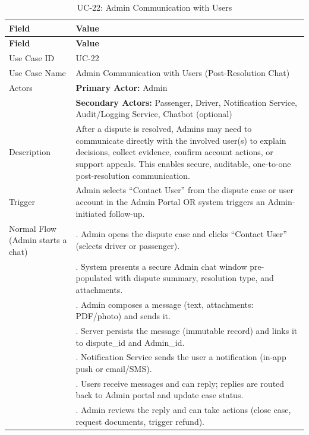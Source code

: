 \begin{longtable}{|>{\raggedright\arraybackslash}p{4cm}|>{\raggedright\arraybackslash}p{11cm}|}
\caption{UC-22: Admin Communication with Users}
\label{tab:uc-22} \\
\hline
\rowcolor{lightgray!30}
\textbf{Field} & \textbf{Value} \\
\hline
\endfirsthead
\hline
\rowcolor{lightgray!30}
\textbf{Field} & \textbf{Value} \\
\hline
\endhead
\hline
\endfoot
\hline
\endlastfoot
Use Case ID & UC-22 \\
\hline
Use Case Name & Admin Communication with Users (Post-Resolution Chat) \\
\hline
Actors & \textbf{Primary Actor:} Admin \\
& \textbf{Secondary Actors:} Passenger, Driver, Notification Service, Audit/Logging Service, Chatbot (optional) \\
\hline
Description & After a dispute is resolved, Admins may need to communicate directly with the involved user(s) to explain decisions, collect evidence, confirm account actions, or support appeals. This enables secure, auditable, one-to-one post-resolution communication. \\
\hline
Trigger & Admin selects ``Contact User'' from the dispute case or user account in the Admin Portal OR system triggers an Admin-initiated follow-up. \\
\hline
Normal Flow (Admin starts a chat) & 1. Admin opens the dispute case and clicks ``Contact User'' (selects driver or passenger). \\
& 2. System presents a secure Admin chat window pre-populated with dispute summary, resolution type, and attachments. \\
& 3. Admin composes a message (text, attachments: PDF/photo) and sends it. \\
& 4. Server persists the message (immutable record) and links it to dispute\_id and Admin\_id. \\
& 5. Notification Service sends the user a notification (in-app push or email/SMS). \\
& 6. Users receive messages and can reply; replies are routed back to Admin portal and update case status. \\
& 7. Admin reviews the reply and can take actions (close case, request documents, trigger refund). \\

\end{longtable}
